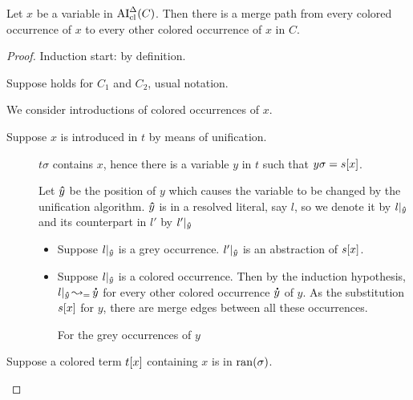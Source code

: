 \documentclass[,%
	paper=a4,%
	DIV9, %
	twoside=false,%
	liststotoc,
	bibtotoc,
	draft=false,%
	numbers=noendperiod
]{scrartcl}
\begin{document}
\begin{clemma}
	\label{lemma:arrow_from_all_colored_to_all_colored}
	Let $x$ be a variable in $\operatorname{AI}_\mathrm{cl}^\Delta(C)$.
	Then there is a merge path from every colored occurrence of $x$ to every other colored occurrence of $x$ in $C$.
\end{clemma}
	\begin{proof}

		Induction start: by definition.

		Suppose holds for $C_1$ and $C_2$, usual notation.

		We consider introductions of colored occurrences of $x$.

		\begin{description}
			\item [Suppose $x$ is introduced in $t$ by means of unification.]
				$t\sigma$ contains $x$, hence there is a variable $y$ in $t$ such that $y\sigma = s[x]$.

				\cbstart
				Let $\bm\hat y$ be the position of $y$ which causes the variable to be changed by the unification algorithm.
				$\bm\hat y$ is in a resolved literal, say $l$, so we denote it by $l|_{\bm\hat y}$ and its counterpart in $l'$ by $l'|_{\bm\hat y}$
				\cbend{}

				\begin{itemize}
					\item 
						Suppose $l|_{\bm\hat y}$ is a grey occurrence.
						$l'|_{\bm\hat y}$ is an abstraction of $s[x]$.
						\mytodo{}

					\item
						Suppose $l|_{\bm\hat y}$ is a colored occurrence.
						Then by the induction hypothesis, $l|_{\bm\hat y} \operatorname{\leadsto_=} \bm\dot y$ for every other colored occurrence $\bm\dot y$ of $y$. As the substitution $s[x]$ for $y$, there are merge edges between all these occurrences.

						For the grey occurrences of $y$ \mytodo{}

				\end{itemize}


			\item [Suppose a colored term $t[x]$ containing $x$ is in $\operatorname{ran}(\sigma)$.]
		\end{description}

	\end{proof}
\end{document}
